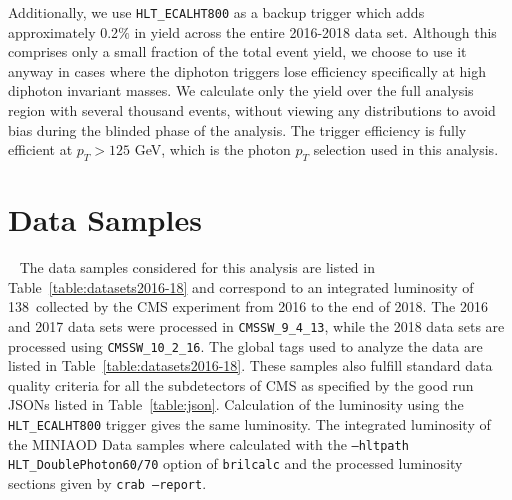 Additionally, we use \texttt{HLT\_ECALHT800} as a backup trigger which adds approximately 0.2$\%$ in yield across the entire 2016-2018 data set. Although this comprises only a small fraction of the total event yield, we choose to use it anyway in cases where the diphoton triggers lose efficiency specifically at high diphoton invariant masses. We calculate only the yield over the full analysis region with several thousand events, without viewing any distributions to avoid bias during the blinded phase of the analysis. The trigger efficiency is fully efficient at $p_T > 125$ GeV, which is the photon $p_{T}$ selection used in this analysis. 

\section{Data Samples}~\label{Data samples}
The data samples considered for this analysis are listed in Table~\ref{table:datasets2016-18} and correspond to an integrated luminosity of 138~\fbinv collected by the CMS experiment from 2016 to the end of 2018. The 2016 and 2017 data sets were processed in {\tt CMSSW\_9\_4\_13}, while the 2018 data sets are processed using {\tt CMSSW\_10\_2\_16}. The global tags used to analyze the data are listed in Table~\ref{table:datasets2016-18}. These samples also fulfill standard data quality criteria for all the subdetectors of CMS as specified by the good run JSONs listed in Table~\ref{table:json}. Calculation of the luminosity using the \texttt{HLT\_ECALHT800} trigger gives the same luminosity. The integrated luminosity of the MINIAOD Data samples where calculated with the \texttt{--hltpath HLT\_DoublePhoton60/70} option of \texttt{brilcalc} and the processed luminosity sections given by \texttt{crab --report}.

